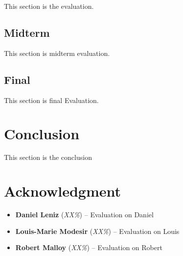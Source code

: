 \documentclass{article}
\begin{document}
This section is the evaluation.


\subsection{Midterm}

This section is midterm evaluation.


\subsection{Final}

This section is final Evaluation.


\section{Conclusion}

This section is the conclusion


\section{Acknowledgment}

\begin{itemize}
  \item \textbf{Daniel Leniz} (\textit{XX\%}) – Evaluation on Daniel
  \item \textbf{Louis-Marie Modesir} (\textit{XX\%}) – Evaluation on Louis
  \item \textbf{Robert Malloy} (\textit{XX\%}) – Evaluation on Robert
\end{itemize}



\end{document}
